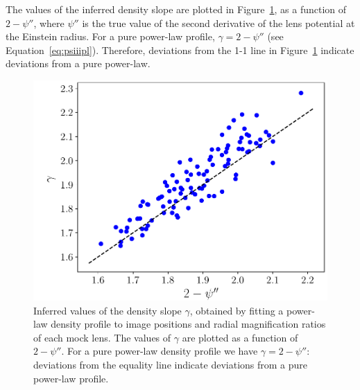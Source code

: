 \documentclass[usenatbib]{mnras}
\def\psiii{\psi''}
\def\Fref#1{Figure~\ref{#1}\xspace}
\def\Eref#1{Equation~\ref{#1}\xspace}
\begin{document}
The values of the inferred density slope are plotted in \Fref{fig:slope}, as a function of $2-\psiii$, where $\psiii$ is the true value of the second derivative of the lens potential at the Einstein radius. For a pure power-law profile, $\gamma = 2-\psiii$ (see \Eref{eq:psiiipl}). Therefore, deviations from the 1-1 line in \Fref{fig:slope} indicate deviations from a pure power-law.
%
\begin{figure}
 \includegraphics[width=\columnwidth]{gamma_fit-eps-converted-to.pdf}
 \caption{
Inferred values of the density slope $\gamma$, obtained by fitting a power-law density profile to image positions and radial magnification ratios of each mock lens. The values of $\gamma$ are plotted as a function of $2-\psiii$. For a pure power-law density profile we have $\gamma = 2-\psiii$: deviations from the equality line indicate deviations from a pure power-law profile.
}
 \label{fig:slope}
\end{figure}
%
\end{document}
